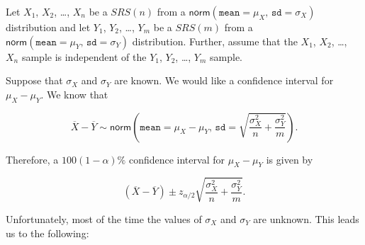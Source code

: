 \documentclass[]{book}
\numberwithin{equation}{chapter}
\numberwithin{figure}{chapter}
\theoremstyle{plain}
\theoremstyle{definition}
\theoremstyle{remark}
\theoremstyle{definition}
\theoremstyle{definition}
\theoremstyle{remark}
\begin{document}
Let \(X_{1}\), \(X_{2}\), \ldots{}, \(X_{n}\) be a \(SRS(n)\) from a
\(\mathsf{norm}(\mathtt{mean}=\mu_{X},\,\mathtt{sd}=\sigma_{X})\)
distribution and let \(Y_{1}\), \(Y_{2}\), \ldots{}, \(Y_{m}\) be a
\(SRS(m)\) from a
\(\mathsf{norm}(\mathtt{mean}=\mu_{Y},\,\mathtt{sd}=\sigma_{Y})\)
distribution. Further, assume that the \(X_{1}\), \(X_{2}\), \ldots{},
\(X_{n}\) sample is independent of the \(Y_{1}\), \(Y_{2}\), \ldots{},
\(Y_{m}\) sample.

Suppose that \(\sigma_{X}\) and \(\sigma_{Y}\) are known. We would like
a confidence interval for \(\mu_{X}-\mu_{Y}\). We know that

\begin{equation}
\overline{X}-\overline{Y}\sim\mathsf{norm}\left(\mathtt{mean}=\mu_{X}-\mu_{Y},\,\mathtt{sd}=\sqrt{\frac{\sigma_{X}^{2}}{n}+\frac{\sigma_{Y}^{2}}{m}}\right).
\end{equation}

Therefore, a \(100(1-\alpha)\%\) confidence interval for
\(\mu_{X}-\mu_{Y}\) is given by

\begin{equation}
\label{eq-two-samp-mean-CI}
\left(\overline{X}-\overline{Y}\right)\pm z_{\alpha/2}\sqrt{\frac{\sigma_{X}^{2}}{n}+\frac{\sigma_{Y}^{2}}{m}}.
\end{equation}

Unfortunately, most of the time the values of \(\sigma_{X}\) and
\(\sigma_{Y}\) are unknown. This leads us to the following:
\end{document}
